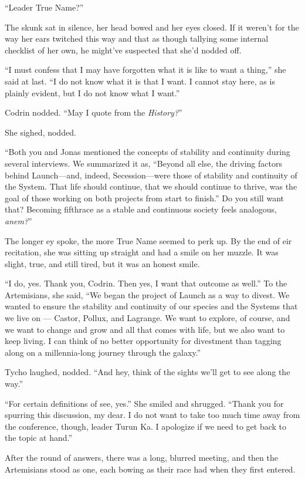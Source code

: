 ``Leader True Name?''

The skunk sat in silence, her head bowed and her eyes closed. If it weren't for the way her ears twitched this way and that as though tallying some internal checklist of her own, he might've suspected that she'd nodded off.

``I must confess that I may have forgotten what it is like to want a thing,'' she said at last. ``I do not know what it is that I want. I cannot stay here, as is plainly evident, but I do not know what I want.''

Codrin nodded. ``May I quote from the \emph{History?}''

She sighed, nodded.

``Both you and Jonas mentioned the concepts of stability and continuity during several interviews. We summarized it as, ``Beyond all else, the driving factors behind Launch—and, indeed, Secession—were those of stability and continuity of the System. That life should continue, that we should continue to thrive, was the goal of those working on both projects from start to finish.'' Do you still want that? Becoming fifthrace as a stable and continuous society feels analogous, \emph{anem?}''

The longer ey spoke, the more True Name seemed to perk up. By the end of eir recitation, she was sitting up straight and had a smile on her muzzle. It was slight, true, and still tired, but it was an honest smile.

``I do, yes. Thank you, Codrin. Then yes, I want that outcome as well.'' To the Artemisians, she said, ``We began the project of Launch as a way to divest. We wanted to ensure the stability and continuity of our species and the Systems that we live on — Castor, Pollux, and Lagrange. We want to explore, of course, and we want to change and grow and all that comes with life, but we also want to keep living. I can think of no better opportunity for divestment than tagging along on a millennia-long journey through the galaxy.''

Tycho laughed, nodded. ``And hey, think of the sights we'll get to see along the way.''

``For certain definitions of see, yes.'' She smiled and shrugged. ``Thank you for spurring this discussion, my dear. I do not want to take too much time away from the conference, though, leader Turun Ka. I apologize if we need to get back to the topic at hand.''

After the round of answers, there was a long, blurred meeting, and then the Artemisians stood as one, each bowing as their race had when they first entered.

